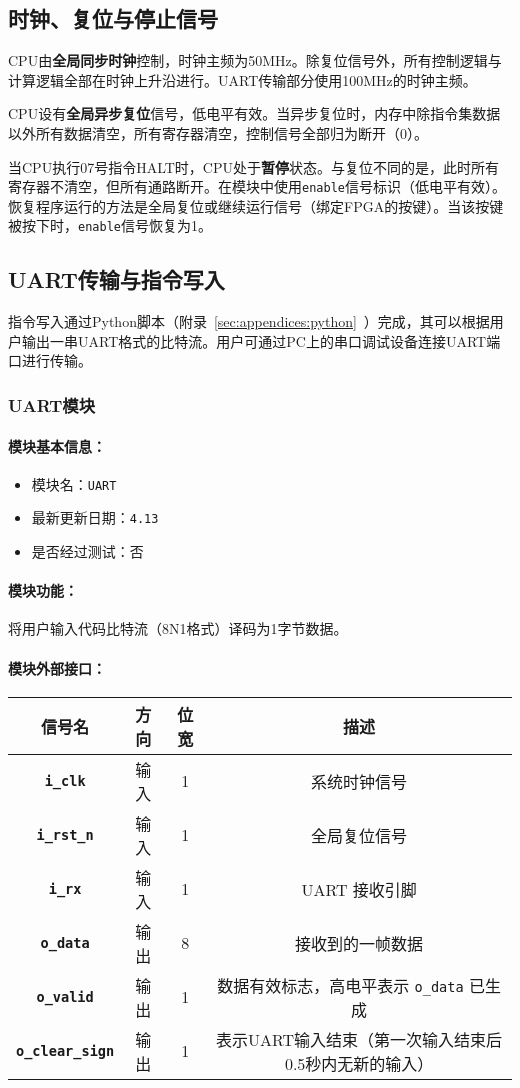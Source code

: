 \documentclass[lang=cn,a4paper,newtx]{elegantpaper}
\begin{document}
\subsection{时钟、复位与停止信号}
CPU由\textbf{全局同步时钟}控制，时钟主频为50MHz。除复位信号外，所有控制逻辑与计算逻辑全部在时钟上升沿进行。UART传输部分使用100MHz的时钟主频。

CPU设有\textbf{全局异步复位}信号，低电平有效。当异步复位时，内存中除指令集数据以外所有数据清空，所有寄存器清空，控制信号全部归为断开（0）。

当CPU执行07号指令HALT时，CPU处于\textbf{暂停}状态。与复位不同的是，此时所有寄存器不清空，但所有通路断开。在模块中使用\texttt{enable}信号标识（低电平有效）。恢复程序运行的方法是全局复位或继续运行信号（绑定FPGA的按键）。当该按键被按下时，\texttt{enable}信号恢复为1。
\subsection{UART传输与指令写入}
指令写入通过Python脚本（附录~\ref{sec:appendices:python}~）完成，其可以根据用户输出一串UART格式的比特流。用户可通过PC上的串口调试设备连接UART端口进行传输。

\subsubsection{UART模块}
\paragraph{模块基本信息：}
\begin{itemize}
  \item 模块名：\texttt{UART}
  \item 最新更新日期：\texttt{4.13}
  \item 是否经过测试：否
\end{itemize}
\paragraph{模块功能：}
将用户输入代码比特流（8N1格式）译码为1字节数据。
\paragraph{模块外部接口：}

\begin{longtable}{>{\bfseries}c c c c}
  \toprule
  信号名 & 方向 & 位宽 & 描述 \\
  \midrule
  \endhead
  
  \texttt{i\_clk}   & 输入  & 1      & 系统时钟信号 \\
  \texttt{i\_rst\_n} & 输入  & 1      & 全局复位信号 \\
  \texttt{i\_rx}    & 输入  & 1      & UART 接收引脚 \\
  \texttt{o\_data}  & 输出  & 8    & 接收到的一帧数据 \\
  \texttt{o\_valid} & 输出  & 1      & 数据有效标志，高电平表示 \texttt{o\_data} 已生成 \\
  \texttt{o\_clear\_sign}    & 输出   & 1       & 表示UART输入结束（第一次输入结束后0.5秒内无新的输入）\\
  \bottomrule
  \end{longtable}
\end{document}
